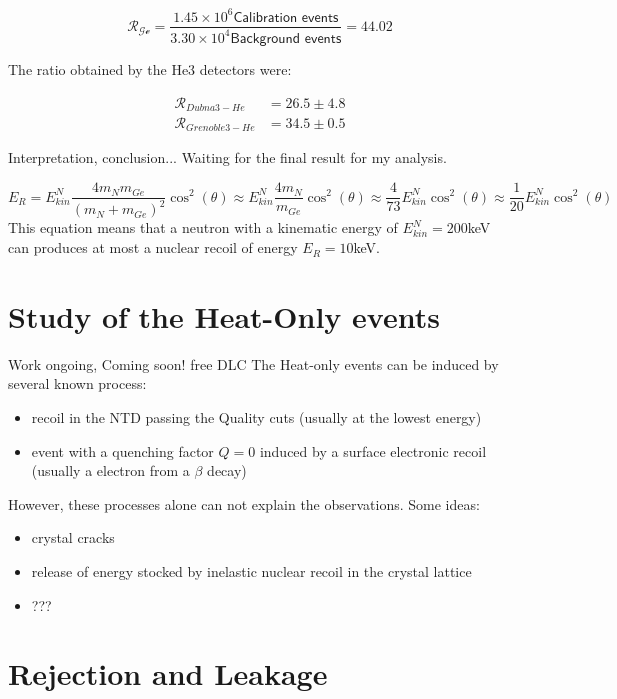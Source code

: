 \begin{equation}
\mathcal{R_{Ge}} = \frac{ 1.45 \times 10^6 \textsf{Calibration events} }{ 3.30 \times 10^4 \textsf{Background events} } = 44.02
\end{equation}

The ratio obtained by the He3 detectors were:

\begin{equation}
\begin{array}{cc}
\mathcal{R}_{Dubna 3-He} &= 26.5 \pm 4.8 \\
\mathcal{R}_{Grenoble 3-He} &= 34.5 \pm 0.5
\end{array}
\end{equation}

{\color{red} Interpretation, conclusion... Waiting for the final result for my analysis.}

\begin{equation}
E_R
= E_{kin}^N \frac{ 4 m_N m_{Ge} }{ \left( m_N + m_{Ge} \right)^2 } \cos^2(\theta)
\approx E_{kin}^N \frac{ 4 m_N }{ m_{Ge} } \cos^2(\theta)
\approx \frac{4}{73} E_{kin}^N \cos^2(\theta)
\approx \frac{1}{20} E_{kin}^N \cos^2(\theta)
\end{equation}
This equation means that a neutron with a kinematic energy of $E_{kin}^N = 200$keV can produces at most a nuclear recoil of energy $E_R = 10$keV.

\section{Study of the Heat-Only events}

{\color{red} Work ongoing, Coming soon! free DLC}
The Heat-only events can be induced by several known process:
\begin{itemize}
	\item recoil in the NTD passing the Quality cuts (usually at the lowest energy)
	\item event with a quenching factor $Q=0$ induced by a surface electronic recoil (usually a electron from a $\beta$ decay)
\end{itemize}
However, these processes alone can not explain the observations. Some ideas:
\begin{itemize}
	\item crystal cracks
	\item release of energy stocked by inelastic nuclear recoil in the crystal lattice
	\item ???
\end{itemize}

\section{Rejection and Leakage}

